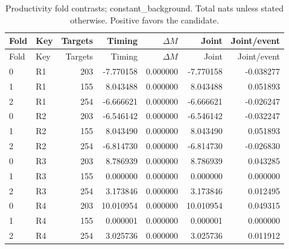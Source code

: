 {\small
\setlength{\tabcolsep}{3pt}
\begin{longtable}{llrrrrr}
\caption{Productivity fold contrasts; constant\_background. Total nats unless stated otherwise. Positive favors the candidate.}\label{tab:R-constant_background}\\
\toprule
Fold & Key & Targets & Timing & $\Delta M$ & Joint & Joint/event\\\midrule
\endfirsthead
\toprule
Fold & Key & Targets & Timing & $\Delta M$ & Joint & Joint/event\\\midrule
\endhead
0 & R1 & 203 & -7.770158 & 0.000000 & -7.770158 & -0.038277\\
1 & R1 & 155 & 8.043488 & 0.000000 & 8.043488 & 0.051893\\
2 & R1 & 254 & -6.666621 & 0.000000 & -6.666621 & -0.026247\\
0 & R2 & 203 & -6.546142 & 0.000000 & -6.546142 & -0.032247\\
1 & R2 & 155 & 8.043490 & 0.000000 & 8.043490 & 0.051893\\
2 & R2 & 254 & -6.814730 & 0.000000 & -6.814730 & -0.026830\\
0 & R3 & 203 & 8.786939 & 0.000000 & 8.786939 & 0.043285\\
1 & R3 & 155 & 0.000000 & 0.000000 & 0.000000 & 0.000000\\
2 & R3 & 254 & 3.173846 & 0.000000 & 3.173846 & 0.012495\\
0 & R4 & 203 & 10.010954 & 0.000000 & 10.010954 & 0.049315\\
1 & R4 & 155 & 0.000001 & 0.000000 & 0.000001 & 0.000000\\
2 & R4 & 254 & 3.025736 & 0.000000 & 3.025736 & 0.011912\\
\bottomrule
\end{longtable}
}

